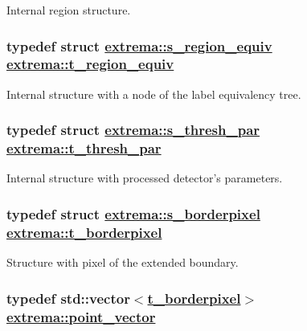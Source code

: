 Internal region structure. 

\hypertarget{namespaceextrema_42db5ac790d7a031f39fabe108eb784d}{
\subsubsection[t\_\-region\_\-equiv]{\setlength{\rightskip}{0pt plus 5cm}typedef struct \hyperlink{structextrema_1_1s__region__equiv}{extrema::s\_\-region\_\-equiv}  \hyperlink{structextrema_1_1s__region__equiv}{extrema::t\_\-region\_\-equiv}}}
\label{namespaceextrema_42db5ac790d7a031f39fabe108eb784d}


Internal structure with a node of the label equivalency tree. 

\hypertarget{namespaceextrema_86995a754292e8ace3b0fc651631fec0}{
\subsubsection[t\_\-thresh\_\-par]{\setlength{\rightskip}{0pt plus 5cm}typedef struct \hyperlink{structextrema_1_1s__thresh__par}{extrema::s\_\-thresh\_\-par}  \hyperlink{structextrema_1_1s__thresh__par}{extrema::t\_\-thresh\_\-par}}}
\label{namespaceextrema_86995a754292e8ace3b0fc651631fec0}


Internal structure with processed detector's parameters. 

\hypertarget{namespaceextrema_26d3969d4cd15bc77e67e66d7c56d117}{
\subsubsection[t\_\-borderpixel]{\setlength{\rightskip}{0pt plus 5cm}typedef struct \hyperlink{structextrema_1_1s__borderpixel}{extrema::s\_\-borderpixel}  \hyperlink{structextrema_1_1s__borderpixel}{extrema::t\_\-borderpixel}}}
\label{namespaceextrema_26d3969d4cd15bc77e67e66d7c56d117}


Structure with pixel of the extended boundary. 

\hypertarget{namespaceextrema_b08df8a480b75ca2cc69c83e902d5a8e}{
\subsubsection[point\_\-vector]{\setlength{\rightskip}{0pt plus 5cm}typedef std::vector$<$\hyperlink{structextrema_1_1s__borderpixel}{t\_\-borderpixel}$>$ \hyperlink{namespaceextrema_b08df8a480b75ca2cc69c83e902d5a8e}{extrema::point\_\-vector}}}
\label{namespaceextrema_b08df8a480b75ca2cc69c83e902d5a8e}


